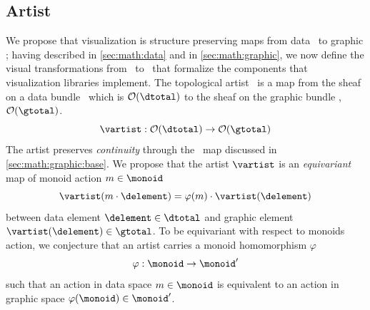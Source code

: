 \documentclass[../main.tex]{subfiles}
\begin{document}
\subsection{Artist}
\label{sec:artist}
We propose that visualization is structure preserving maps from data \dtotal\ to graphic \gtotal; having described \dtotal in \autoref{sec:math:data} and \gtotal in \autoref{sec:math:graphic}, we now define the visual transformations from \dtotal\ to \gtotal\ that formalize the components that visualization libraries implement. The topological artist \vartist\ is a map from the sheaf on a data bundle \dtotal\ which is $\mathcal{O}(\dtotal)$ to the sheaf on the graphic bundle \gtotal, $\mathcal{O}(\gtotal)$. 
\begin{equation}
    \vartist: \mathcal{O}(\dtotal) \rightarrow \mathcal{O}(\gtotal)
    \label{eq:math:artist:artist}
\end{equation}
The artist preserves \textit{continuity} through the \vindex\ map discussed in \autoref{sec:math:graphic:base}.  We propose that the artist $\mathscr{\vartist}$ is an \textit{equivariant} map of monoid action  $m \in \monoid$
\begin{equation}
\vartist(m\cdot \delement) = \varphi(m)\cdot \vartist(\delement) 
\end{equation}
between data element $\delement \in \mathscr{\dtotal}$ and graphic element $\vartist(\delement) \in \mathscr{\gtotal}$. To be equivariant with respect to monoids action, we conjecture that an  artist carries a monoid homomorphism $\varphi$
\begin{equation}
    \varphi: \monoid \rightarrow \monoid^{\prime}
\end{equation}
such that an action in data space $m \in \monoid$ is equivalent to an action in graphic space $\varphi(\monoid) \in \monoid^{\prime}$. 
\end{document}
